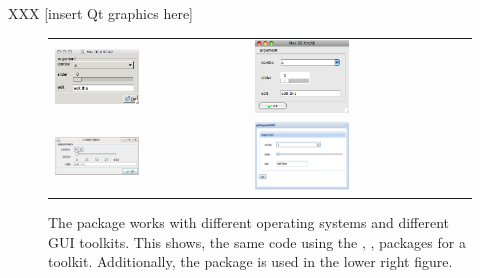 XXX      [insert Qt graphics here] 
\begin{figure}
  \centering
  \begin{tabular}{ll}
     \includegraphics[width=0.45\textwidth]{ex-33-macosx-rgtk2} &
     \includegraphics[width=0.45\textwidth]{fig-gWidgets-ex-33-tlctk}\\
    \includegraphics[width=0.45\textwidth]{ex-33-linux-rJava} &
     \includegraphics[width=0.45\textwidth]{ex-33-gWidgetsWWW}
 \end{tabular}
 \caption{The  package works with different operating
   systems and different GUI toolkits. This shows, the same code using the
   , ,  packages for a toolkit. Additionally,
   the  package is used in the lower right figure.}
  \label{fig:gWidgets-three-oses}
\end{figure}

